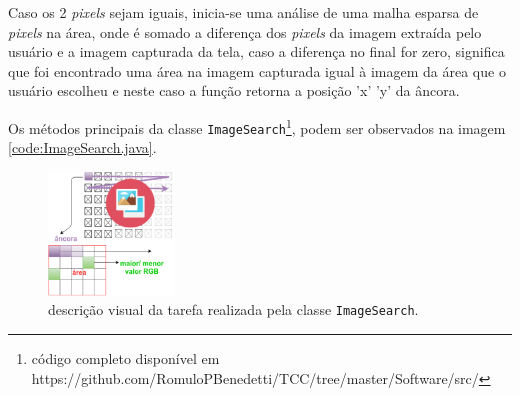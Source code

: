 \documentclass[tg]{mdtufsm}
\begin{document}
                    Caso os 2 \emph{pixels} sejam iguais, inicia-se uma análise de uma malha esparsa de \emph{pixels} na área, onde é somado a diferença dos \emph{pixels} da imagem extraída pelo usuário e a imagem capturada da tela, caso a diferença no final for zero, significa que foi encontrado uma área na imagem capturada igual à imagem da área que o usuário escolheu e neste caso a função retorna a posição 'x' 'y' da âncora.

                    Os métodos principais da classe \texttt{ImageSearch}\footnote{código completo disponível em https://github.com/RomuloPBenedetti/TCC/tree/master/Software/src/}, podem ser observados na imagem \ref{code:ImageSearch.java}.

                    \begin{figure}[!htb]
                        {\centering
                        \includegraphics[width=0.3\textwidth]{imagens/searchImage.png}
                        \caption{descrição visual da tarefa realizada pela classe \texttt{ImageSearch}.}
                        \label{fig:ImageSearch}}
                    \end{figure}
\end{document}
